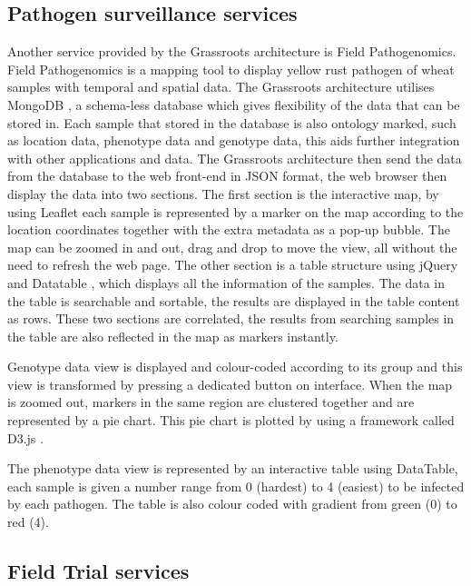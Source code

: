 \documentclass[12pt,a4paper]{extarticle}
\begin{document}
\subsection*{Pathogen surveillance services}

Another service provided by the Grassroots architecture is Field Pathogenomics. 
Field Pathogenomics is a mapping tool to display yellow rust pathogen of wheat samples with temporal and spatial data. 
The Grassroots architecture utilises MongoDB \cite{mongodb}, a schema-less database which gives flexibility of the data that can be stored in. 
Each sample that stored in the database is also ontology marked, such as location data, phenotype data and genotype data, this aids further integration with other applications and data. 
The Grassroots architecture then send the data from the database to the web front-end in JSON format, the web browser then display the data into two sections. 
The first section is the interactive map, by using Leaflet \cite{leaflet} each sample is represented by a marker on the map according to the location coordinates together with the extra metadata as a pop-up bubble.
The map can be zoomed in and out, drag and drop to move the view, all without the need to refresh the web page.
The other section is a table structure using jQuery \cite{jquery} and Datatable \cite{datatable}, which displays all the information of the samples.
The data in the table is searchable and sortable, the results are displayed in the table content as rows. 
These two sections are correlated, the results from searching samples in the table are also reflected in the map as markers instantly.

Genotype data view is displayed and colour-coded according to its group and this view is transformed by pressing a dedicated button on interface. 
When the map is zoomed out, markers in the same region are clustered together and are represented by a pie chart. 
This pie chart is plotted by using a framework called D3.js \cite{d3js}.

The phenotype data view is represented by an interactive table using DataTable, each sample is given a number range from 0 (hardest) to 4 (easiest) to be infected by each pathogen. The table is also colour coded with gradient from green (0) to red (4).

\subsection*{Field Trial services}
\end{document}

